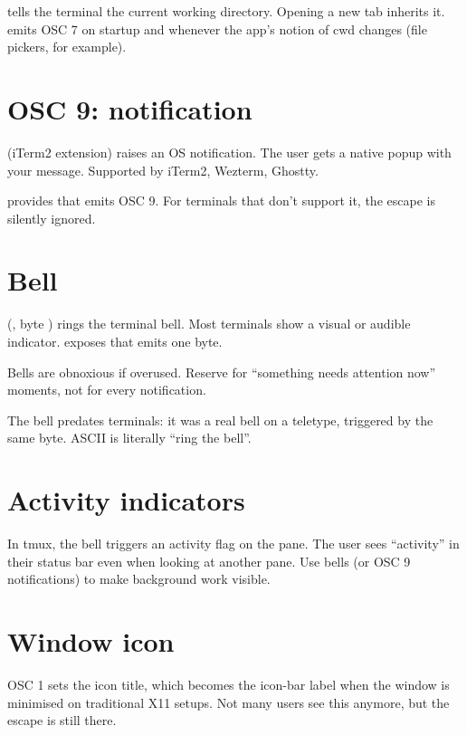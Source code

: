 \code{ESC ] 7 ; file://hostname/path BEL} tells the terminal
the current working directory. Opening a new tab inherits it.
\maya{} emits OSC 7 on startup and whenever the app's notion
of cwd changes (file pickers, for example).

\section{OSC 9: notification}

\code{ESC ] 9 ; message BEL} (iTerm2 extension) raises an OS
notification. The user gets a native popup with your message.
Supported by iTerm2, Wezterm, Ghostty.

\maya{} provides  that emits OSC 9. For
terminals that don't support it, the escape is silently
ignored.

\section{Bell}

 (, byte ) rings
the terminal bell. Most terminals show a visual or audible
indicator. \maya{} exposes  that emits one byte.

Bells are obnoxious if overused. Reserve for ``something
needs attention now'' moments, not for every notification.

\begin{funfact}
The bell predates terminals: it was a real bell on a
teletype, triggered by the same byte. ASCII  is
literally ``ring the bell''.
\end{funfact}

\section{Activity indicators}

In tmux, the bell triggers an activity flag on the pane. The
user sees ``activity'' in their status bar even when looking
at another pane. Use bells (or OSC 9 notifications) to make
background work visible.

\section{Window icon}

OSC 1 sets the icon title, which becomes the icon-bar label
when the window is minimised on traditional X11 setups. Not
many users see this anymore, but the escape is still there.

